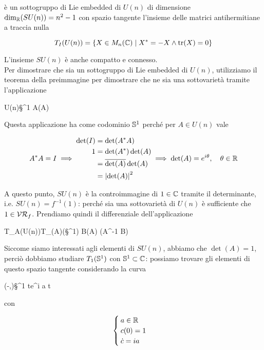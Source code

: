 è un sottogruppo di Lie embedded di $ U(n) $ di dimensione $ \dim_{\R}(SU(n)) = n^{2} - 1 $ con spazio tangente l'insieme delle matrici antihermitiane a traccia nulla

\begin{equation}
	T_{I}(U(n)) = \{ X \in M_{n}(\C) \mid X^{*} = -X \wedge \tr(X) = 0 \}
\end{equation}

L'insieme $ SU(n) $ è anche compatto e connesso.\\
Per dimostrare che sia un sottogruppo di Lie embedded di $ U(n) $, utilizziamo il teorema della preimmagine per dimostrare che ne sia una sottovarietà tramite l'applicazione

	{U(n)}{\S^{1}}
	{A}{\det(A)}

Questa applicazione ha come codominio $ \S^{1} $ perché per $ A \in U(n) $ vale

\begin{equation}
	A^{*} A = I %
	\implies %
	\begin{aligned}
		\det(I) &= \det(A^{*} A) \\
		1 &= \det(A^{*}) \det(A) \\
		&= \overline{\det(A)} \det(A) \\
		&= \abs{\det(A)}^{2}
	\end{aligned} %
	\implies %
	\det(A) = e^{i \theta} \qcomma \theta \in \R
\end{equation}

A questo punto, $ SU(n) $ è la controimmagine di $ 1 \in \C $ tramite il determinante, i.e. $ SU(n) = f^{-1}(1) $: perché sia una sottovarietà di $ U(n) $ è sufficiente che $ 1 \in \VR_{f} $. Prendiamo quindi il differenziale dell'applicazione 

	{T_{A}(U(n))}{T_{\det(A)}(\S^{1})}
	{B}{\det(A) \tr(A^{-1} B)}
	
Siccome siamo interessati agli elementi di $ SU(n) $, abbiamo che $ \det(A) = 1 $, perciò dobbiamo studiare $ T_{1}(\S^{1}) $ con $ \S^{1} \subset \C $: possiamo trovare gli elementi di questo spazio tangente considerando la curva

	{(-\varepsilon,\varepsilon)}{\S^{1}}
	{t}{e^{i a t}}
	
con

\begin{equation}
	\begin{cases}
		a \in \R \\
		c(0) = 1 \\
		\dot{c} = i a
	\end{cases}
\end{equation}

